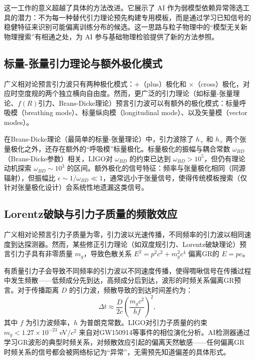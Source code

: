这一工作的意义超越了具体的方法改进。它展示了 AI 作为弱模型依赖异常筛选工具的潜力：不为每一种替代引力理论预先构建专用模板，而是通过学习已知信号的稳健特征来识别可能偏离训练分布的候选。这一思路与粒子物理中的“模型无关新物理搜索”有相通之处，为 AI 参与基础物理检验提供了新的方法参照。

\subsection{标量-张量引力理论与额外极化模式}

广义相对论预言引力波只有两种极化模式：$+$（plus）极化和 $\times$（cross）极化，对应时空度规的两个独立横向自由度。然而，更广泛的引力理论（如标量-张量理论、$f(R)$引力、Brans-Dicke理论）预言引力波可以有额外的极化模式：标量呼吸模（breathing mode）、标量纵向模（longitudinal mode）、以及矢量模（vector modes）。

在Brans-Dicke理论（最简单的标量-张量理论）中，引力波除了 $h_+$ 和 $h_\times$ 两个张量极化之外，还存在额外的“呼吸模”标量极化。标量极化的振幅与耦合常数 $\omega_{BD}$（Brans-Dicke参数）相关，LIGO对 $\omega_{BD}$ 的约束已达到 $\omega_{BD} > 10^5$，但仍有理论动机探索 $\omega_{BD} \sim 10^3$ 的区间。额外极化的信号特征：频率与张量极化相同（同源辐射），但振幅比 $\epsilon \sim 1/\omega_{BD} \ll 1$，通常远小于张量信号，使得传统模板搜索（仅针对张量极化设计）会系统性地遗漏这类信号。

\subsection{Lorentz破缺与引力子质量的频散效应}

广义相对论预言引力子质量为零，引力波以光速传播，不同频率的引力波以相同速度到达探测器。然而，某些修正引力理论（如双度规引力、Lorentz破缺理论）预言引力子具有非零质量 $m_g$，导致色散关系 $E^2 = p^2c^2 + m_g^2c^4$ 偏离GR的 $E = pc$。

有质量引力子会导致不同频率的引力波以不同速度传播，使得啁啾信号在传播过程中发生频散——低频成分先到达，高频成分后到达，波形的时频关系偏离GR预言。对于传播距离 $D$ 的引力波，频散导致的到达时间差约为：
\begin{equation}
\Delta t \approx \frac{D}{2c} \left(\frac{m_g c^2}{h f}\right)^2,
\end{equation}
其中 $f$ 为引力波频率，$h$ 为普朗克常数。LIGO对引力子质量的约束 $m_g < 1.27 \times 10^{-23}$ eV/$c^2$ 来自对GW150914等事件的相位演化分析。AI检测器通过学习GR波形的典型时频关系，对频散效应引起的偏离天然敏感——任何偏离GR时频关系的信号都会被网络标记为“异常”，无需预先知道偏差的具体形式。

